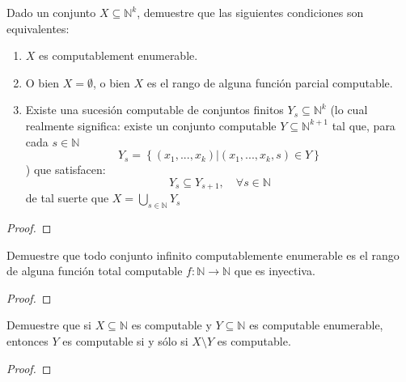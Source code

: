 \documentclass[12pt]{report}
\newcounter{it}
\theoremstyle{largebreak}
\newcommand\cf[3]{\ensuremath{#1:#2\rightarrow#3}}
\begin{document}
    \begin{excer}
        Dado un conjunto $X\subseteq\mathbb{N}^k$, demuestre que las siguientes condiciones son equivalentes:
        \begin{enumerate}[label = \textit{(\alph*)}]
            \item $X$ es computablement enumerable.
            \item O bien $X=\emptyset$, o bien $X$ es el rango de alguna función parcial computable.
            \item Existe una sucesión computable de conjuntos finitos $Y_s\subseteq\mathbb{N}^k$ (lo cual realmente significa: existe un conjunto computable $Y\subseteq\mathbb{N}^{ k+1}$ tal que, para cada $s\in\mathbb{N}$
            \begin{equation*}
                Y_s=\left\{(x_1,...,x_k)\Big|(x_1,...,x_k,s)\in Y \right\}
            \end{equation*}
            ) que satisfacen:
            \begin{equation*}
                Y_s\subseteq Y_{ s+1},\quad\forall s\in\mathbb{N}
            \end{equation*}
            de tal suerte que $X=\bigcup_{ s\in\mathbb{N}}Y_s$
        \end{enumerate}
    \end{excer}

    \begin{proof}
        
    \end{proof}

    \begin{excer}
        Demuestre que todo conjunto infinito computablemente enumerable es el rango de alguna función total computable $\cf{f}{\mathbb{N}}{\mathbb{N}}$ que es inyectiva.
    \end{excer}

    \begin{proof}
        
    \end{proof}
        
    \begin{excer}
        Demuestre que si $X\subseteq\mathbb{N}$ es computable y $Y\subseteq\mathbb{N}$ es computable enumerable, entonces $Y$ es computable si y sólo si $X\setminus Y$ es computable.
    \end{excer}

    \begin{proof}
        
    \end{proof}
\end{document}
